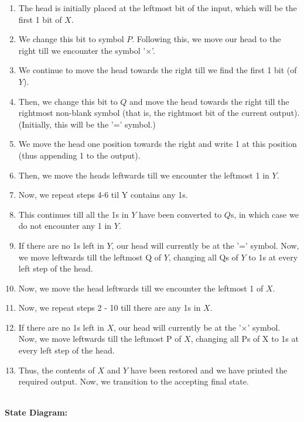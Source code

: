 \documentclass[12pt,a4paper]{article}
\begin{document}
\begin{enumerate}
    \item The head is initially placed at the leftmost bit of the input, which will be the first 1 bit of $X$.
    \item We change this bit to symbol $P$. Following this, we move our head to the right till we encounter the symbol '$\times$'.
    \item We continue to move the head towards the right till we find the first 1 bit (of $Y$). 
    \item Then, we change this bit to $Q$ and move the head towards the right till the rightmost non-blank symbol (that is, the rightmost bit of the current output). (Initially, this will be the '=' symbol.)
    \item We move the head one position towards the right and write 1 at this position (thus appending 1 to the output).
    \item Then, we move the heads leftwards till we encounter the leftmost 1 in $Y$. 
    \item Now, we repeat steps 4-6 til Y contains any 1s.
    \item This continues till all the 1s in $Y$ have been converted to $Q$s, in which case we do not encounter any 1 in $Y$.
    \item If there are no 1s left in $Y$, our head will currently be at the '=' symbol. Now, we move leftwards till the leftmost Q of $Y$, changing all Qs of $Y$ to 1s at every left step of the head.
    \item Now, we move the head leftwards till we encounter the leftmost 1 of $X$.
    \item Now, we repeat steps 2 - 10 till there are any 1s in $X$.
    \item If there are no 1s left in $X$, our head will currently be at the '$\times$' symbol. Now, we move leftwards till the leftmost P of $X$, changing all Ps of X to 1s at every left step of the head.
    \item Thus, the contents of $X$ and $Y$ have been restored and we have printed the required output. Now, we transition to the accepting final state.
    
\end{enumerate}
\\\textbf{State Diagram:}
\end{document}

